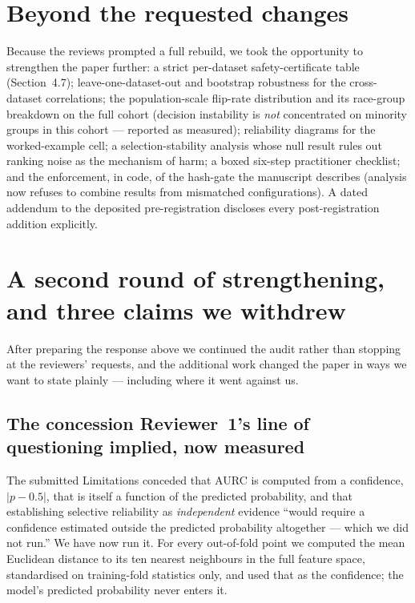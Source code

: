 \documentclass[11pt]{article}
\begin{document}
\section*{Beyond the requested changes}

Because the reviews prompted a full rebuild, we took the opportunity to strengthen the paper
further: a strict per-dataset safety-certificate table (Section~4.7); leave-one-dataset-out and
bootstrap robustness for the cross-dataset correlations; the population-scale flip-rate
distribution and its race-group breakdown on the full cohort (decision instability is \emph{not}
concentrated on minority groups in this cohort --- reported as measured); reliability diagrams for
the worked-example cell; a selection-stability analysis whose null result rules out ranking noise
as the mechanism of harm; a boxed six-step practitioner checklist; and the enforcement, in code,
of the hash-gate the manuscript describes (analysis now refuses to combine results from mismatched
configurations). A dated addendum to the deposited pre-registration discloses every
post-registration addition explicitly.

\section*{A second round of strengthening, and three claims we withdrew}

After preparing the response above we continued the audit rather than stopping at the reviewers'
requests, and the additional work changed the paper in ways we want to state plainly --- including
where it went against us.

\subsection*{The concession Reviewer~1's line of questioning implied, now measured}

The submitted Limitations conceded that AURC is computed from a confidence, $|p-0.5|$, that is
itself a function of the predicted probability, and that establishing selective reliability as
\emph{independent} evidence ``would require a confidence estimated outside the predicted probability
altogether --- which we did not run.'' We have now run it. For every out-of-fold point we computed
the mean Euclidean distance to its ten nearest neighbours in the full feature space, standardised on
training-fold statistics only, and used that as the confidence; the model's predicted probability
never enters it.
\end{document}
